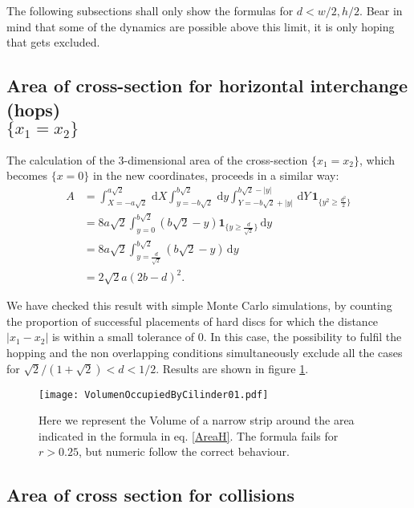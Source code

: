 \documentclass[a4paper,10pt, jcp, aps, preprint]{revtex4-1}
\newcommand{\rd}{\, \mathrm{d}}
\newcommand{\indicator}[1]{\mathbf{1}_{ \{   #1 \} } }
\begin{document}
The following subsections shall only show the formulas for $d<w/2, h/2$.
Bear in mind that some of the dynamics are possible above this limit,
it is only hoping that gets excluded. 

\subsection{Area of cross-section for horizontal interchange (hops) \\ 
$\{x_1 = x_2\}$}

The calculation of the $3$-dimensional area of the cross-section 
$\{x_1 = x_2\}$, which becomes 
$\{ x=0 \}$ in the new coordinates, proceeds in a similar way:
\begin{align}
 A &= \int_{X=-a \sqrt{2} }^{a \sqrt{2}}  \rd X
 \int_{y=-b \sqrt{2}}^{b \sqrt{2}} \rd y
\int_{Y=-b \sqrt{2} + |y| }^{b \sqrt{2}-|y|}  \rd Y
\, \indicator{y^2 \ge \frac{d^2}{2} } \\
&= 8 a \sqrt{2} \int_{y=0}^{b \sqrt{2}} 
\left( b \sqrt{2} - y \right)  \indicator{y \ge \frac{d}{\sqrt{2}}}  \rd y \\
&= 8 a \sqrt{2} \int_{y= \frac{d}{\sqrt{2}}}^{b \sqrt{2}}  \left( b \sqrt{2} - y \right)  \rd y \\
&= 2 \sqrt{2} a ( 2b - d )^2. \label{AreaH}
\end{align}

We have checked this result with simple Monte Carlo simulations, 
by counting the proportion of successful placements of hard discs for which the distance 
$|x_1 - x_2|$ is within a small tolerance of $0$. In this case, the possibility to fulfil
the hopping and the non overlapping conditions simultaneously exclude 
all the cases for $\sqrt{2}/(1+\sqrt{2}) <d<1/2$. Results are shown in figure \ref{AreaHopp01}.

\begin{figure}
\centering
\texttt{[image: VolumenOccupiedByCilinder01.pdf]}
\caption{Here we represent the Volume of a narrow strip around the area
indicated in the formula in eq. \ref{AreaH}. The formula fails for $r>0.25$, but
numeric follow the correct behaviour. } 

\label{AreaHopp01}
\end{figure}


\subsection{Area of cross section for collisions}
\end{document}

